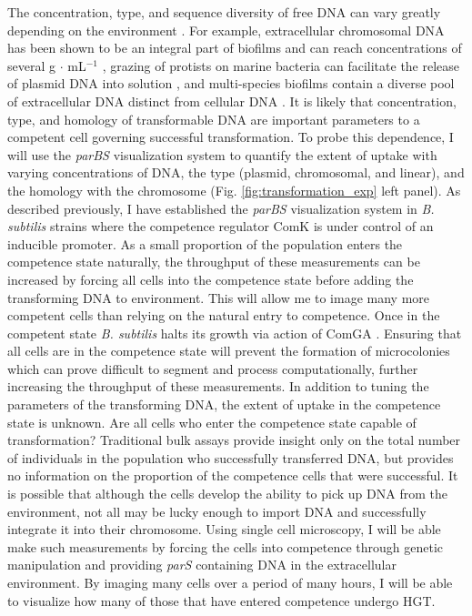 The concentration, type, and sequence diversity of free DNA can vary greatly
depending on the environment \cite{DellAnno:2002uw, DeFlaun:1987vw,
Matsui:2003hd}. For example, extracellular chromosomal DNA has been shown to be
an integral part of biofilms and can reach concentrations of several \textmu g
$\cdot$ mL$^{-1}$ \cite{Tang:2013kj}, grazing of protists on marine bacteria can
facilitate the release of plasmid DNA into solution 
\cite{Matsui:2003hd}, and multi-species biofilms contain a diverse pool of
extracellular DNA distinct from cellular DNA \cite{Steinberger:2005bg}. It is
likely that concentration, type, and homology of transformable DNA are important parameters to a
competent cell governing successful transformation. To
probe this dependence, I will use the \textit{parBS} visualization system to
quantify the extent of uptake with varying concentrations of DNA, the type
(plasmid, chromosomal, and linear), and the homology with the chromosome (Fig.
\ref{fig:transformation_exp} left panel). As described previously, I have
established the \textit{parBS} visualization system in \textit{B. subtilis}
strains where the competence regulator ComK is under control of an inducible
promoter. As a small proportion of the population enters the competence state
naturally, the throughput of these measurements can be increased by forcing all
cells into the competence state before adding the transforming DNA to
environment. This will allow me to image many more competent cells than relying
on the natural entry to competence. Once in the competent state
\textit{B. subtilis} halts its growth via action of ComGA \cite{Haijema:2001ui}.
Ensuring that all cells are in the competence state will prevent the formation
of microcolonies which can prove difficult to segment and process
computationally, further increasing the throughput of these measurements. In
addition to tuning the parameters of the transforming DNA, the extent of uptake
in the competence state is unknown. Are all cells who enter the competence state
capable of transformation? Traditional bulk assays provide insight
only on the total number of individuals in the population who successfully
transferred DNA, but provides no information on the proportion of the competence
cells that were successful. It is possible that although the cells develop the
ability to pick up DNA from the environment, not all may be lucky enough to
import DNA and successfully integrate it into their chromosome. Using single
cell microscopy, I will be able make such measurements by forcing the cells into
competence through genetic manipulation and providing \textit{parS} containing
DNA in the extracellular environment. By imaging many cells over a period of
many hours, I will be able to visualize how many of those that have entered
competence undergo HGT.

